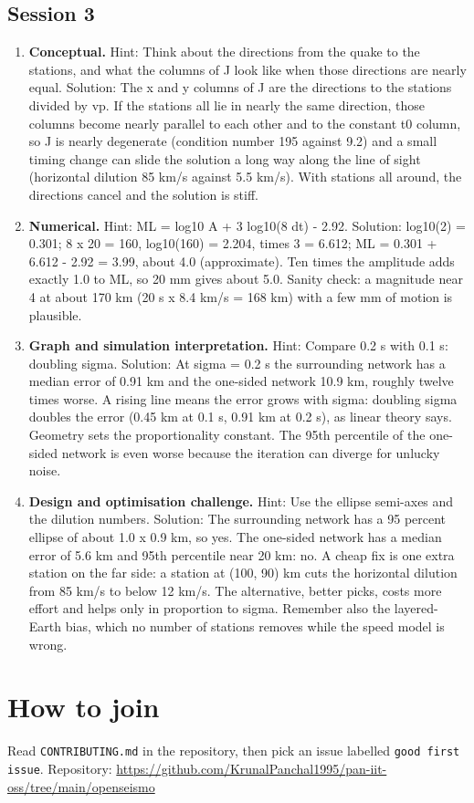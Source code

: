 \documentclass[11pt,a4paper]{article}
\begin{document}
\subsection*{Session 3}
\begin{enumerate}[nosep]
\item \textbf{Conceptual.} Hint: Think about the directions from the quake to the stations, and what the columns of J look like when those directions are nearly equal. Solution: The x and y columns of J are the directions to the stations divided by vp. If the stations all lie in nearly the same direction, those columns become nearly parallel to each other and to the constant t0 column, so J is nearly degenerate (condition number 195 against 9.2) and a small timing change can slide the solution a long way along the line of sight (horizontal dilution 85 km/s against 5.5 km/s). With stations all around, the directions cancel and the solution is stiff.
\item \textbf{Numerical.} Hint: ML = log10 A + 3 log10(8 dt) - 2.92. Solution: log10(2) = 0.301; 8 x 20 = 160, log10(160) = 2.204, times 3 = 6.612; ML = 0.301 + 6.612 - 2.92 = 3.99, about 4.0 (approximate). Ten times the amplitude adds exactly 1.0 to ML, so 20 mm gives about 5.0. Sanity check: a magnitude near 4 at about 170 km (20 s x 8.4 km/s = 168 km) with a few mm of motion is plausible.
\item \textbf{Graph and simulation interpretation.} Hint: Compare 0.2 s with 0.1 s: doubling sigma. Solution: At sigma = 0.2 s the surrounding network has a median error of 0.91 km and the one-sided network 10.9 km, roughly twelve times worse. A rising line means the error grows with sigma: doubling sigma doubles the error (0.45 km at 0.1 s, 0.91 km at 0.2 s), as linear theory says. Geometry sets the proportionality constant. The 95th percentile of the one-sided network is even worse because the iteration can diverge for unlucky noise.
\item \textbf{Design and optimisation challenge.} Hint: Use the ellipse semi-axes and the dilution numbers. Solution: The surrounding network has a 95 percent ellipse of about 1.0 x 0.9 km, so yes. The one-sided network has a median error of 5.6 km and 95th percentile near 20 km: no. A cheap fix is one extra station on the far side: a station at (100, 90) km cuts the horizontal dilution from 85 km/s to below 12 km/s. The alternative, better picks, costs more effort and helps only in proportion to sigma. Remember also the layered-Earth bias, which no number of stations removes while the speed model is wrong.
\end{enumerate}

\section{How to join}
Read \texttt{CONTRIBUTING.md} in the repository, then pick an issue labelled \texttt{good first issue}. Repository: \url{https://github.com/KrunalPanchal1995/pan-iit-oss/tree/main/openseismo}
\end{document}

